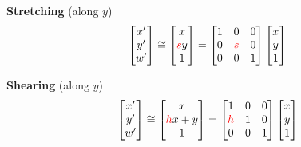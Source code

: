 \begin{listu}
    \textbf{Stretching} (along $y$) \[
        \begin{bmatrix}
            x' \\ y' \\ w'
        \end{bmatrix} \cong \begin{bmatrix}
            x \\ {\color{red} s} y \\ 1
        \end{bmatrix} = \begin{bmatrix}
            1 & 0 & 0 \\
            0 & {\color{red} s} & 0 \\
            0 & 0 & 1
        \end{bmatrix} \begin{bmatrix}
            x \\ y \\ 1
        \end{bmatrix}
    \]

    \item \textbf{Shearing} (along $y$) \[
        \begin{bmatrix}
            x' \\ y' \\ w'
        \end{bmatrix} \cong \begin{bmatrix}
            x \\ {\color{red} h} x + y \\ 1
        \end{bmatrix} = \begin{bmatrix}
            1 & 0 & 0 \\
            {\color{red} h} & 1 & 0 \\
            0 & 0 & 1
        \end{bmatrix} \begin{bmatrix}
            x \\ y \\ 1
        \end{bmatrix}
    \]


\end{listu}
